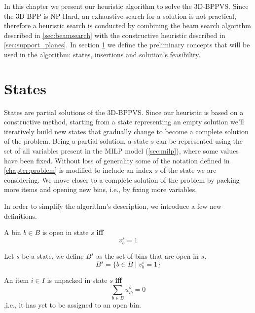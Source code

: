 In this chapter we present our heuristic algorithm to solve the 3D-BPPVS. 
Since the 3D-BPP is NP-Hard, an exhaustive search for a solution is not practical, therefore a heuristic search is conducted by combining the beam search algorithm described in \cref{sec:beamsearch} with the constructive heuristic described in \cref{sec:support_planes}.
In section \ref{sec:problem_state} we define the preliminary concepts that will be used in the algorithm: states, insertions and solution's feasibility.

\section{States}
\label{sec:problem_state}%
States are partial solutions of the 3D-BPPVS. Since our heuristic is based on a constructive method, starting from a state representing an empty solution we'll iteratively build new states that gradually change to become a complete solution of the problem.
Being a partial solution, a state $s$ can be represented using the set of all variables present in the MILP model (\ref{sec:milp}), where some values have been fixed. 
Without loss of generality some of the notation defined in \cref{chapter:problem} is modified to include an index $s$ of the state we are considering.
We move closer to a complete solution of the problem by packing more items and opening new bins, i.e., by fixing more variables.

In order to simplify the algorithm's description, we introduce a few new definitions.
\begin{definition}
    A bin $b \in B$ is open in state $s$ \textbf{iff}
    \begin{equation*}
        v^{s}_{b} = 1
    \end{equation*}
\end{definition}

\begin{definition}
    Let $s$ be a state, we define $B^s$ as the set of bins that are open in $s$.
    \begin{equation*}
        B^s = \{ b \in B \mid v^{s}_{b} = 1 \}
    \end{equation*}
\end{definition}

\begin{definition}
    An item $i \in I$ is unpacked in state $s$ \textbf{iff}
    \begin{equation*}
        \sum_{b \in B} u^{s}_{ib} = 0
    \end{equation*}
    ,i.e., it has yet to be assigned to an open bin.
\end{definition}

